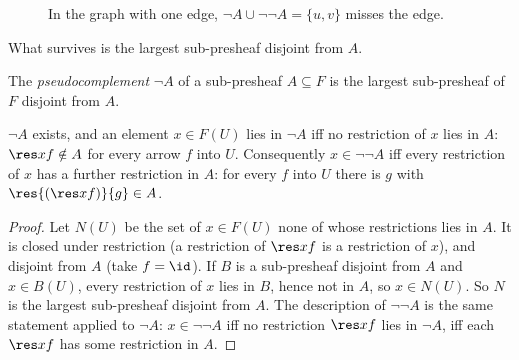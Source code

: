\begin{figure}[ht]
\centering
{}
\caption{In the graph with one edge, $\neg A\cup\neg\neg A = \{u,v\}$ misses the edge.}\label{fig:edge}
\end{figure}

What survives is the largest sub-presheaf disjoint from $A$.

\begin{definition}[Pseudocomplement]
The \emph{pseudocomplement} $\neg A$ of a sub-presheaf $A\subseteq F$ is the largest sub-presheaf of $F$ disjoint from $A$.
\end{definition}

\begin{lemma}\label{lem:neg}
$\neg A$ exists, and an element $x\in F(U)$ lies in $\neg A$ iff no restriction of $x$ lies in $A$: $\res xf\notin A$ for every arrow $f$ into $U$. Consequently $x\in\neg\neg A$ iff every restriction of $x$ has a further restriction in $A$: for every $f$ into $U$ there is $g$ with $\res{(\res xf)}{g}\in A$.
\end{lemma}

\begin{proof}
Let $N(U)$ be the set of $x\in F(U)$ none of whose restrictions lies in $A$. It is closed under restriction (a restriction of $\res xf$ is a restriction of $x$), and disjoint from $A$ (take $f = \id$). If $B$ is a sub-presheaf disjoint from $A$ and $x\in B(U)$, every restriction of $x$ lies in $B$, hence not in $A$, so $x\in N(U)$. So $N$ is the largest sub-presheaf disjoint from $A$. The description of $\neg\neg A$ is the same statement applied to $\neg A$: $x\in\neg\neg A$ iff no restriction $\res xf$ lies in $\neg A$, iff each $\res xf$ has some restriction in $A$.
\end{proof}

